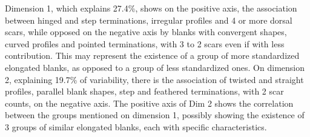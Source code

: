 \documentclass[12pt,twoside]{reedthesis}
\begin{document}
Dimension 1, which explains 27.4\%, shows on the positive axis, the association between hinged and step terminations, irregular profiles and 4 or more dorsal scars, while opposed on the negative axis by blanks with convergent shapes, curved profiles and pointed terminations, with 3 to 2 scars even if with less contribution. This may represent the existence of a group of more standardized elongated blanks, as opposed to a group of less standardized ones.
On dimension 2, explaining 19.7\% of variability, there is the association of twisted and straight profiles, parallel blank shapes, step and feathered terminations, with 2 scar counts, on the negative axis. The positive axis of Dim 2 shows the correlation between the groups mentioned on dimension 1, possibly showing the existence of 3 groups of similar elongated blanks, each with specific characteristics.
\end{document}
